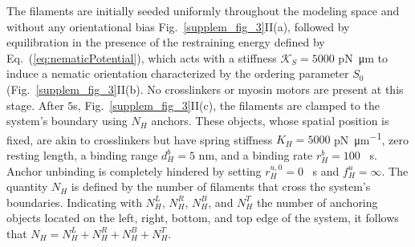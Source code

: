 The filaments are initially seeded uniformly throughout the modeling space and without any orientational bias Fig.~\ref{supplem_fig_3}II(a), followed by equilibration in the presence of the restraining energy defined by Eq.~(\ref{eq:nematicPotential}), which acts with a stiffness $\mathcal{K}_S = 5000$ \si{\pico\newton \micro\meter} to induce a nematic orientation characterized by the ordering parameter $S_0$ (Fig.~\ref{supplem_fig_3}II(b). No crosslinkers or myosin motors are present at this stage.
After $5$\si{\second}, Fig.~\ref{supplem_fig_3}II(c), the filaments are clamped to the system's boundary using $N_H$ anchors. These objects, whose spatial position is fixed, are akin to crosslinkers but have spring stiffness $K_H = 5000$ \si{\pico\newton \per \micro\meter}, zero resting length, a binding range $d_H^b = 5$ \si{\nano\meter}, and a binding rate $r_H^b = 100$ \si{\per\second}. Anchor unbinding is completely hindered by setting $r_H^{u,0} = 0$ \si{\per\second} and $f_H^u = \infty$. The quantity $N_H$ is defined by the number of filaments that cross the system's boundaries. Indicating with $N_H^L$, $N_H^R$, $N_H^B$, and $N_H^T$ the number of anchoring objects located on the left, right, bottom, and top edge of the system, it follows that $N_H = N_H^L + N_H^R + N_H^B + N_H^T$.

